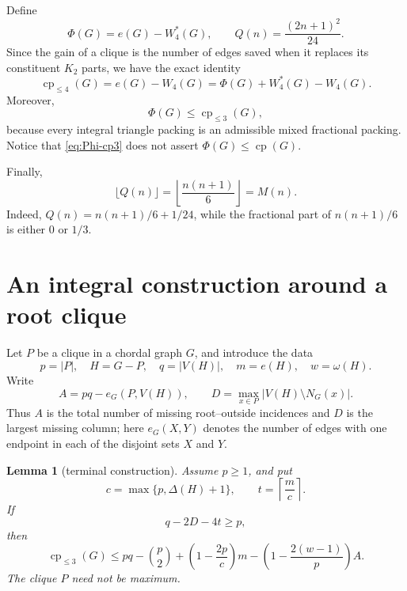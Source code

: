 \documentclass[11pt,reqno]{amsart}
\numberwithin{equation}{section}
\newtheorem{lemma}[theorem]{Lemma}
\theoremstyle{definition}
\theoremstyle{remark}
\newcommand{\cp}{\operatorname{cp}}
\newcommand{\cple}[1]{\operatorname{cp}_{\leq #1}}
\newcommand{\Wint}{W_4}
\newcommand{\Wfrac}{W_4^*}
\newcommand{\PhiF}{\Phi}
\begin{document}
Define
\begin{equation}\label{eq:functional-definitions}
  \PhiF(G)=e(G)-\Wfrac(G),\qquad
  Q(n)=\frac{(2n+1)^2}{24}.
\end{equation}
Since the gain of a clique is the number of edges saved when it replaces its
constituent $K_2$ parts, we have the exact identity
\begin{equation}\label{eq:cp4-identity}
  \cple{4}(G)=e(G)-\Wint(G)
  =\PhiF(G)+\Wfrac(G)-\Wint(G).
\end{equation}
Moreover,
\begin{equation}\label{eq:Phi-cp3}
  \PhiF(G)\leq \cple{3}(G),
\end{equation}
because every integral triangle packing is an admissible mixed fractional
packing.  Notice that \eqref{eq:Phi-cp3} does not assert
$\PhiF(G)\leq\cp(G)$.

Finally,
\begin{equation}\label{eq:floor-identity}
  \lfloor Q(n)\rfloor
  =\left\lfloor\frac{n(n+1)}6\right\rfloor=M(n).
\end{equation}
Indeed, $Q(n)=n(n+1)/6+1/24$, while the fractional part of $n(n+1)/6$ is
either $0$ or $1/3$.

\section{An integral construction around a root clique}

Let $P$ be a clique in a chordal graph $G$, and introduce the data
\begin{equation}\label{eq:root-data}
  p=|P|,\quad H=G-P,\quad q=|V(H)|,\quad
  m=e(H),\quad w=\omega(H).
\end{equation}
Write
\begin{equation}\label{eq:root-defects}
  A=pq-e_G(P,V(H)),\qquad
  D=\max_{x\in P}|V(H)\setminus N_G(x)|.
\end{equation}
Thus $A$ is the total number of missing root--outside incidences and $D$ is
the largest missing column; here $e_G(X,Y)$ denotes the number of edges with
one endpoint in each of the disjoint sets $X$ and $Y$.

\begin{lemma}[terminal construction]\label{lem:terminal-construction}
Assume $p\geq1$, and put
\[
  c=\max\{p,\Delta(H)+1\},\qquad
  t=\left\lceil\frac{m}{c}\right\rceil.
\]
If
\begin{equation}\label{eq:host-condition}
  q-2D-4t\geq p,
\end{equation}
then
\begin{equation}\label{eq:terminal-bound}
  \cple{3}(G)
  \leq pq-\binom p2
    +\left(1-\frac{2p}{c}\right)m
    -\left(1-\frac{2(w-1)}p\right)A.
\end{equation}
The clique $P$ need not be maximum.
\end{lemma}
\end{document}
